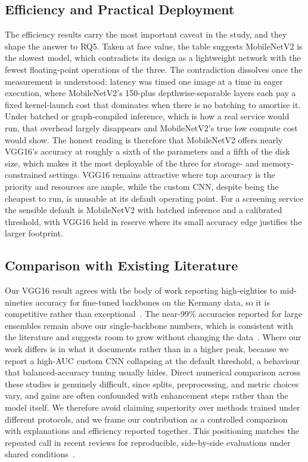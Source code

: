 \documentclass[preprint,12pt]{elsarticle}
\begin{document}
\subsection{Efficiency and Practical Deployment}
The efficiency results carry the most important caveat in the study, and they shape the answer to RQ5.
Taken at face value, the table suggests MobileNetV2 is the slowest model, which contradicts its design as a lightweight network with the fewest floating-point operations of the three.
The contradiction dissolves once the measurement is understood: latency was timed one image at a time in eager execution, where MobileNetV2's 150-plus depthwise-separable layers each pay a fixed kernel-launch cost that dominates when there is no batching to amortise it.
Under batched or graph-compiled inference, which is how a real service would run, that overhead largely disappears and MobileNetV2's true low compute cost would show.
The honest reading is therefore that MobileNetV2 offers nearly VGG16's accuracy at roughly a sixth of the parameters and a fifth of the disk size, which makes it the most deployable of the three for storage- and memory-constrained settings.
VGG16 remains attractive where top accuracy is the priority and resources are ample, while the custom CNN, despite being the cheapest to run, is unusable at its default operating point.
For a screening service the sensible default is MobileNetV2 with batched inference and a calibrated threshold, with VGG16 held in reserve where its small accuracy edge justifies the larger footprint.

\subsection{Comparison with Existing Literature}
Our VGG16 result agrees with the body of work reporting high-eighties to mid-nineties accuracy for fine-tuned backbones on the Kermany data, so it is competitive rather than exceptional~\cite{ranjan2022transfer,radocaj2025optimizing}.
The near-99\% accuracies reported for large ensembles remain above our single-backbone numbers, which is consistent with the literature and suggests room to grow without changing the data~\cite{kundu2021pneumonia,mabrouk2022pneumonia}.
Where our work differs is in what it documents rather than in a higher peak, because we report a high-AUC custom CNN collapsing at the default threshold, a behaviour that balanced-accuracy tuning usually hides.
Direct numerical comparison across these studies is genuinely difficult, since splits, preprocessing, and metric choices vary, and gains are often confounded with enhancement steps rather than the model itself.
We therefore avoid claiming superiority over methods trained under different protocols, and we frame our contribution as a controlled comparison with explanations and efficiency reported together.
This positioning matches the repeated call in recent reviews for reproducible, side-by-side evaluations under shared conditions~\cite{guleria2024systematic,vyas2026systematic}.
\end{document}
